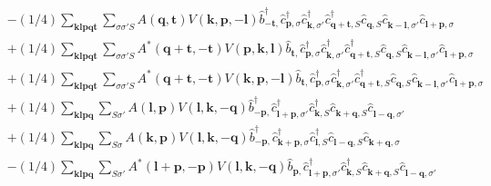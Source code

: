 \begin{align*}
	&-(1/4) \sum_{ \mathbf{k} \mathbf{l} \mathbf{p} \mathbf{q} \mathbf{t} } \sum_{ \sigma \sigma' S } A( \mathbf{q}, \mathbf{t} )  V( \mathbf{k}, \mathbf{p}, -\mathbf{l} )   \hat{b}_{ -\mathbf{t}, }^\dagger  \hat{c}_{ \mathbf{p}, \sigma }^\dagger  \hat{c}_{ \mathbf{k}, \sigma' }^\dagger  \hat{c}_{ \mathbf{q}+\mathbf{t}, S }^\dagger  \hat{c}_{ \mathbf{q}, S }^{\phantom{\dagger}} \hat{c}_{ \mathbf{k}-\mathbf{l}, \sigma' }^{\phantom{\dagger}} \hat{c}_{ \mathbf{l}+\mathbf{p}, \sigma }^{\phantom{\dagger}}  \\
	&+(1/4) \sum_{ \mathbf{k} \mathbf{l} \mathbf{p} \mathbf{q} \mathbf{t} } \sum_{ \sigma \sigma' S } A^*( \mathbf{q}+\mathbf{t}, -\mathbf{t} )  V( \mathbf{p}, \mathbf{k}, \mathbf{l} )   \hat{b}_{ \mathbf{t}, }^{\phantom{\dagger}} \hat{c}_{ \mathbf{p}, \sigma }^\dagger  \hat{c}_{ \mathbf{k}, \sigma' }^\dagger  \hat{c}_{ \mathbf{q}+\mathbf{t}, S }^\dagger  \hat{c}_{ \mathbf{q}, S }^{\phantom{\dagger}} \hat{c}_{ \mathbf{k}-\mathbf{l}, \sigma' }^{\phantom{\dagger}} \hat{c}_{ \mathbf{l}+\mathbf{p}, \sigma }^{\phantom{\dagger}}  \\
	&+(1/4) \sum_{ \mathbf{k} \mathbf{l} \mathbf{p} \mathbf{q} \mathbf{t} } \sum_{ \sigma \sigma' S } A^*( \mathbf{q}+\mathbf{t}, -\mathbf{t} )  V( \mathbf{k}, \mathbf{p}, -\mathbf{l} )   \hat{b}_{ \mathbf{t}, }^{\phantom{\dagger}} \hat{c}_{ \mathbf{p}, \sigma }^\dagger  \hat{c}_{ \mathbf{k}, \sigma' }^\dagger  \hat{c}_{ \mathbf{q}+\mathbf{t}, S }^\dagger  \hat{c}_{ \mathbf{q}, S }^{\phantom{\dagger}} \hat{c}_{ \mathbf{k}-\mathbf{l}, \sigma' }^{\phantom{\dagger}} \hat{c}_{ \mathbf{l}+\mathbf{p}, \sigma }^{\phantom{\dagger}}  \\
	&+(1/4) \sum_{ \mathbf{k} \mathbf{l} \mathbf{p} \mathbf{q} } \sum_{ S \sigma' } A( \mathbf{l}, \mathbf{p} )  V( \mathbf{l}, \mathbf{k}, -\mathbf{q} )   \hat{b}_{ -\mathbf{p}, }^\dagger  \hat{c}_{ \mathbf{l}+\mathbf{p}, \sigma' }^\dagger  \hat{c}_{ \mathbf{k}, S }^\dagger  \hat{c}_{ \mathbf{k}+\mathbf{q}, S }^{\phantom{\dagger}} \hat{c}_{ \mathbf{l}-\mathbf{q}, \sigma' }^{\phantom{\dagger}}  \\
	&+(1/4) \sum_{ \mathbf{k} \mathbf{l} \mathbf{p} \mathbf{q} } \sum_{ S \sigma } A( \mathbf{k}, \mathbf{p} )  V( \mathbf{l}, \mathbf{k}, -\mathbf{q} )   \hat{b}_{ -\mathbf{p}, }^\dagger  \hat{c}_{ \mathbf{k}+\mathbf{p}, \sigma }^\dagger  \hat{c}_{ \mathbf{l}, S }^\dagger  \hat{c}_{ \mathbf{l}-\mathbf{q}, S }^{\phantom{\dagger}} \hat{c}_{ \mathbf{k}+\mathbf{q}, \sigma }^{\phantom{\dagger}}  \\
	&-(1/4) \sum_{ \mathbf{k} \mathbf{l} \mathbf{p} \mathbf{q} } \sum_{ S \sigma' } A^*( \mathbf{l}+\mathbf{p}, -\mathbf{p} )  V( \mathbf{l}, \mathbf{k}, -\mathbf{q} )   \hat{b}_{ \mathbf{p}, }^{\phantom{\dagger}} \hat{c}_{ \mathbf{l}+\mathbf{p}, \sigma' }^\dagger  \hat{c}_{ \mathbf{k}, S }^\dagger  \hat{c}_{ \mathbf{k}+\mathbf{q}, S }^{\phantom{\dagger}} \hat{c}_{ \mathbf{l}-\mathbf{q}, \sigma' }^{\phantom{\dagger}}  \\

\end{align*}
